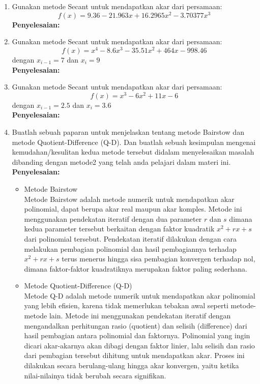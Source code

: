 \documentclass{article}
\newcommand{\penyelesaian}{\textbf{Penyelesaian: }}
\begin{document}
\begin{enumerate}
    \item Gunakan metode Secant untuk mendapatkan akar dari persamaan:
    \begin{equation*}
        f(x) = \num{9,36} - \num{21,963}x + \num{16,2965}x^2 - \num{3,70377}x^3
    \end{equation*}
    \penyelesaian

    \item Gunakan metode Secant untuk mendapatkan akar dari persamaan:
    \begin{equation*}
        f(x) = x^4 - \num{8,6}x^3 - \num{35,51}x^2 + \num{464}x - \num{998,46}
    \end{equation*}
    dengan $x_{i-1} = \num{7}$ dan $x_i = \num{9}$ \\
    \penyelesaian

    \item Gunakan metode Secant untuk mendapatkan akar dari persamaan:
    \begin{equation*}
        f(x) = x^3 - \num{6}x^2 + \num{11}x - \num{6}
    \end{equation*}
    dengan $x_{i-1} = \num{2,5}$ dan $x_i = \num{3,6}$ \\
    \penyelesaian

    \item Buatlah sebuah paparan untuk menjelaskan tentang metode Bairstow dan metode Quotient-Difference (Q-D). 
    Dan buatlah sebuah kesimpulan mengenai kemudahan/kesulitan kedua metode tersebut didalam menyelesaikan masalah dibanding dengan metode2 yang telah anda pelajari dalam materi ini. \\
    \penyelesaian
    \begin{itemize}
        \item Metode Bairstow \\
        Metode Bairstow adalah metode numerik untuk mendapatkan akar polinomial, dapat berupa akar real maupun akar komples.
        Metode ini menggunakan pendekatan iteratif dengan dua parameter $r$ dan $s$ dimana kedua parameter tersebut berkaitan dengan faktor kuadratik $x^2 + rx + s$ dari polinomial tersebut.
        Pendekatan iteratif dilakukan dengan cara melakukan pembagian polinomial dan hasil pembagiannya terhadap $x^2 + rx + s$ terus menerus hingga sisa pembagian konvergen terhadap nol, dimana faktor-faktor kuadratiknya merupakan faktor paling sederhana.
        \item Metode Quotient-Difference (Q-D) \\
        Metode Q-D adalah metode numerik untuk mendapatkan akar polinomial yang lebih efisien, karena tidak memerlukan tebakan awal seperti metode-metode lain.
        Metode ini menggunakan pendekatan iteratif dengan mengandalkan perhitungan rasio (quotient) dan selisih (difference) dari hasil pembagian antara polinomial dan faktornya.
        Polinomial yang ingin dicari akar-akarnya akan dibagi dengan faktor linier, lalu selisih dan rasio dari pembagian tersebut dihitung untuk mendapatkan akar.
        Proses ini dilakukan secara berulang-ulang hingga akar konvergen, yaitu ketika nilai-nilainya tidak berubah secara signifikan.
    \end{itemize}


\end{enumerate}
\end{document}
